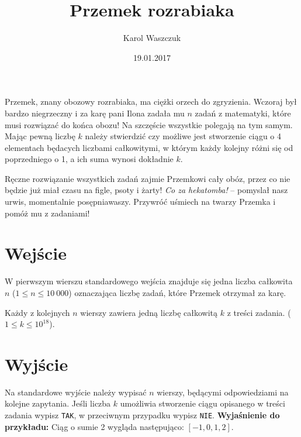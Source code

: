 \documentclass[zad,zawodnik,utf8]{sinol}
\title{Przemek rozrabiaka}
\author{Karol Waszczuk} %
\date{19.01.2017}
\begin{document}
\begin{tasktext}%

Przemek, znany obozowy rozrabiaka, ma ciężki orzech do zgryzienia. Wczoraj był bardzo niegrzeczny i za karę pani Ilona zadała mu $n$ zadań z matematyki, które musi rozwiązać do końca obozu! Na szczęście wszystkie polegają na tym samym. Mając pewną liczbę $k$ należy stwierdzić czy możliwe jest stworzenie ciągu o 4 elementach będacych liczbami całkowitymi, w którym każdy kolejny różni się od poprzedniego o 1, a ich suma wynosi dokładnie $k$.

Ręczne rozwiązanie wszystkich zadań zajmie Przemkowi cały obóz, przez co nie będzie już miał czasu na figle, psoty i żarty! \textit{Co za hekatomba!} -- pomyslał nasz urwis, momentalnie posępniawaszy. Przywróć uśmiech na twarzy Przemka i pomóż mu z zadaniami! 

  \section{Wejście}

W pierwszym wierszu standardowego wejścia znajduje się jedna liczba całkowita $n$ ($1 \leq n \leq 10\ 000$) oznaczająca liczbę zadań, które Przemek otrzymał za karę.
 
Każdy z kolejnych $n$ wierszy zawiera jedną liczbę całkowitą $k$ z treści zadania. ($1 \leq k \leq 10^{18}$).

  \section{Wyjście}
Na standardowe wyjście należy wypisać $n$ wierszy, będącymi odpowiedziami na kolejne zapytania. Jeśli liczba $k$ umożliwia stworzenie ciągu opisanego w treści zadania wypisz \texttt{TAK}, w przeciwnym przypadku wypisz \texttt{NIE}.
\makecompactexample 
\hspace{1cm} \textbf{\newline Wyjaśnienie do przykładu:} Ciąg o sumie 2 wygląda następująco: $[-1, 0, 1, 2]$.

\end{tasktext}
\end{document}
